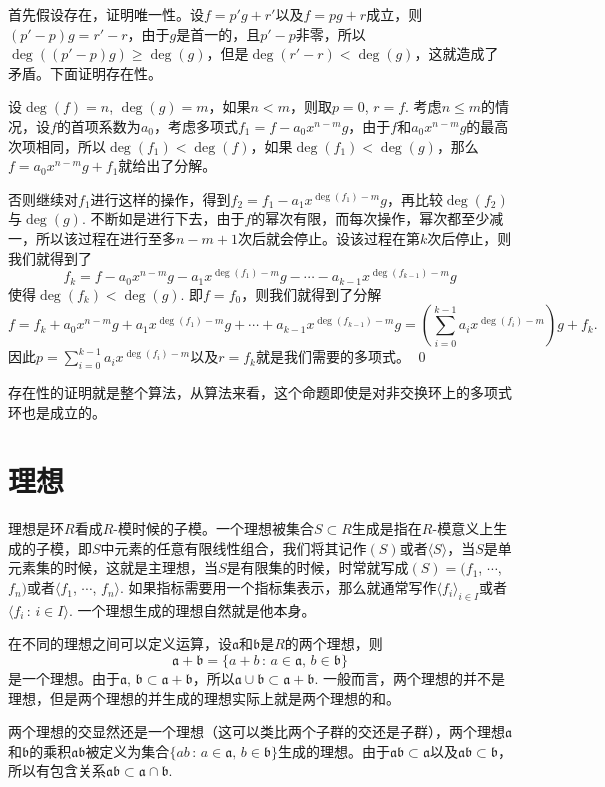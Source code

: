 	首先假设存在，证明唯一性。设$f=p'g+r'$以及$f=pg+r$成立，则$(p'-p)g=r'-r$，由于$g$是首一的，且$p'-p$非零，所以$\deg((p'-p)g)\geq \deg(g)$，但是$\deg(r'-r)< \deg(g)$，这就造成了矛盾。下面证明存在性。

	设$\deg(f)=n$, $\deg(g)=m$，如果$n<m$，则取$p=0$, $r=f$. 考虑$n\leq m$的情况，设$f$的首项系数为$a_0$，考虑多项式$f_1=f-a_0x^{n-m}g$，由于$f$和$a_0x^{n-m}g$的最高次项相同，所以$\deg(f_1)<\deg(f)$，如果$\deg(f_1)<\deg(g)$，那么$f=a_0x^{n-m}g+f_1$就给出了分解。

	否则继续对$f_1$进行这样的操作，得到$f_2=f_1-a_1x^{\deg(f_1)-m}g$，再比较$\deg(f_2)$与$\deg(g)$. 不断如是进行下去，由于$f$的幂次有限，而每次操作，幂次都至少减一，所以该过程在进行至多$n-m+1$次后就会停止。设该过程在第$k$次后停止，则我们就得到了
	\[
	f_{k}=f-a_0x^{n-m}g-a_1x^{\deg(f_1)-m}g-\cdots-a_{k-1}x^{\deg(f_{k-1})-m}g
	\]
	使得$\deg(f_k)< \deg(g)$. 即$f=f_0$，则我们就得到了分解
	\[
	f=f_k+a_0x^{n-m}g+a_1x^{\deg(f_1)-m}g+\cdots+a_{k-1}x^{\deg(f_{k-1})-m}g=\left(\sum_{i=0}^{k-1}a_{i}x^{\deg(f_{i})-m}\right)g+f_k.
	\]
	因此$p=\sum_{i=0}^{k-1}a_{i}x^{\deg(f_{i})-m}$以及$r=f_k$就是我们需要的多项式。
\qed

存在性的证明就是整个算法，从算法来看，这个命题即使是对非交换环上的多项式环也是成立的。

\section{理想}

\para 理想是环$R$看成$R$-模时候的子模。一个理想被集合$S\subset R$生成是指在$R$-模意义上生成的子模，即$S$中元素的任意有限线性组合，我们将其记作$(S)$或者$\langle S\rangle$，当$S$是单元素集的时候，这就是主理想，当$S$是有限集的时候，时常就写成$(S)=(f_1$, $\cdots$, $f_n)$或者$\langle f_1$, $\cdots$, $f_n\rangle$. 如果指标需要用一个指标集表示，那么就通常写作$\langle f_i\rangle_{i\in I}$或者$\langle f_i\,:\,i\in I\rangle$. 一个理想生成的理想自然就是他本身。

\para 在不同的理想之间可以定义运算，设$\mathfrak{a}$和$\mathfrak{b}$是$R$的两个理想，则
\[\mathfrak{a}+\mathfrak{b}=\{a+b\,:\,a\in\mathfrak{a},\,b\in\mathfrak{b}\}
\]
是一个理想。由于$\mathfrak{a}$, $\mathfrak{b}\subset \mathfrak{a}+\mathfrak{b}$，所以$\mathfrak{a}\cup\mathfrak{b}\subset \mathfrak{a}+\mathfrak{b}$. 一般而言，两个理想的并不是理想，但是两个理想的并生成的理想实际上就是两个理想的和。

两个理想的交显然还是一个理想（这可以类比两个子群的交还是子群），两个理想$\mathfrak{a}$和$\mathfrak{b}$的乘积$\mathfrak{a}\mathfrak{b}$被定义为集合$\{ab\,:\,a\in\mathfrak{a},\,b\in\mathfrak{b}\}$生成的理想。由于$\mathfrak{a}\mathfrak{b}\subset \mathfrak{a}$以及$\mathfrak{a}\mathfrak{b}\subset \mathfrak{b}$，所以有包含关系$\mathfrak{a}\mathfrak{b}\subset \mathfrak{a}\cap \mathfrak{b}$.


